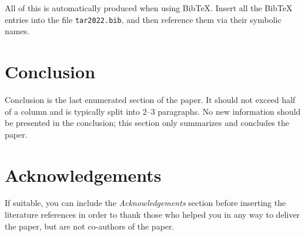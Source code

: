 \documentclass[10pt, a4paper]{article}
\begin{document}
All of this is automatically produced when using BibTeX. Insert all the BibTeX entries into the file \texttt{tar2022.bib}, and then reference them via their symbolic names.

\section{Conclusion}

Conclusion is the last enumerated section of the paper. It should not exceed half of a column and is typically split into 2--3 paragraphs. No new information should be presented in the conclusion; this section only summarizes and concludes the paper.

\section*{Acknowledgements}

If suitable, you can include the \textit{Acknowledgements} section before inserting the literature references  in order to thank those who helped you in any way to deliver the paper, but are not co-authors of the paper.


 
\end{document}
